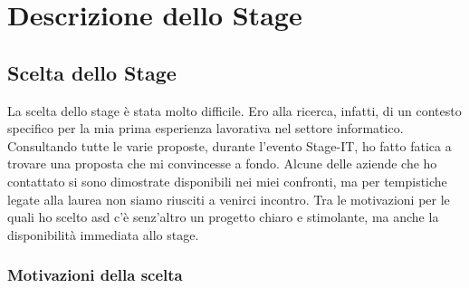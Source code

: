 
\chapter{Descrizione dello Stage}
\label{cap:descrizione-stage}


\section{Scelta dello Stage}

La scelta dello stage è stata molto difficile. Ero alla ricerca, infatti, di un contesto specifico per la mia prima esperienza lavorativa nel settore informatico. Consultando tutte le varie proposte, durante l'evento Stage-IT, ho fatto fatica a trovare una proposta che mi convincesse a fondo. Alcune delle aziende che ho contattato si sono dimostrate disponibili nei miei confronti, ma per tempistiche legate alla laurea non siamo riusciti a venirci incontro. Tra le motivazioni per le quali ho scelto \gls{asd} c'è senz'altro un progetto chiaro e stimolante, ma anche la disponibilità immediata allo stage.

\subsection{Motivazioni della scelta}

